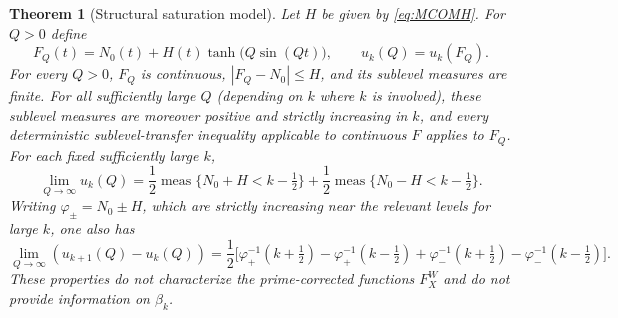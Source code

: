 \documentclass[11pt,a4paper]{article}
\numberwithin{equation}{section}
\newtheorem{theorem}{Theorem}[section]
\theoremstyle{definition}
\theoremstyle{remark}
\newcommand{\meas}{\operatorname{meas}}
\begin{document}
\begin{theorem}[Structural saturation model]\label{thm:structural}
Let $H$ be given by \eqref{eq:MCOMH}. For $Q>0$ define
\begin{equation}\label{eq:sat-model}
F_Q(t)=N_0(t)+H(t)\tanh\bigl(Q\sin(Qt)\bigr),
\qquad u_k(Q)=u_k(F_Q).
\end{equation}
For every $Q>0$, $F_Q$ is continuous, $|F_Q-N_0|\le H$, and its sublevel measures are finite. For all sufficiently large $Q$ (depending on $k$ where $k$ is involved), these sublevel measures are moreover positive and strictly increasing in $k$, and every deterministic sublevel-transfer inequality applicable to continuous $F$ applies to $F_Q$. For each fixed sufficiently large $k$,
\begin{equation}\label{eq:sat-limit}
\lim_{Q\to\infty}u_k(Q)
=\frac12\meas\{N_0+H<k-\tfrac12\}
 +\frac12\meas\{N_0-H<k-\tfrac12\}.
\end{equation}
Writing $\varphi_\pm=N_0\pm H$, which are strictly increasing near the relevant levels for large $k$, one also has
\begin{equation}\label{eq:sat-spacing}
\lim_{Q\to\infty}(u_{k+1}(Q)-u_k(Q))
=\frac12\bigl[\varphi_+^{-1}(k+\tfrac12)-\varphi_+^{-1}(k-\tfrac12)
+\varphi_-^{-1}(k+\tfrac12)-\varphi_-^{-1}(k-\tfrac12)\bigr].
\end{equation}
These properties do not characterize the prime-corrected functions $F_X^W$ and do not provide information on $\beta_k$.
\end{theorem}
\end{document}
